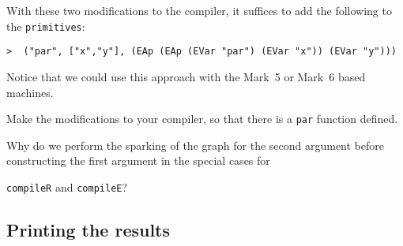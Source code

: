 With these two modifications to the compiler, it suffices to add the
following to the \mbox{\tt primitives}:
\begin{verbatim}
>  ("par", ["x","y"], (EAp (EAp (EVar "par") (EVar "x")) (EVar "y")))
\end{verbatim}
Notice that we could use this approach with the Mark~5 or Mark~6 based
machines.

\begin{exercise}\label{pgm:X:primitives1}
Make the modifications to your compiler, so that there is a \mbox{\tt par}
function defined.
\end{exercise}

\begin{exercise}\label{pgm:X:primitives1comp}
Why do we perform the sparking of the graph for the second argument
before constructing the first argument in the special cases for

\mbox{\tt compileR} and \mbox{\tt compileE}?
\end{exercise}

\subsection{Printing the results}

